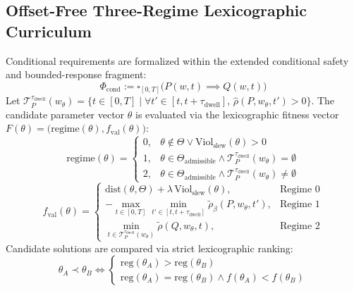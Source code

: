 \documentclass[journal]{IEEEtran}
\begin{document}
\subsection{Offset-Free Three-Regime Lexicographic Curriculum}
Conditional requirements are formalized within the extended conditional safety and bounded-response fragment:
\begin{equation}
\Phi_{\text{cond}} := \square_{[0, T]} \big(P(w, t) \implies Q(w, t)\big)
\end{equation}
Let $\mathcal{T}_P^{\tau_{\text{dwell}}}(w_\theta) = \{ t \in [0, T] \mid \forall t' \in [t, t+\tau_{\text{dwell}}], \, \hat{\rho}(P, w_\theta, t') > 0 \}$. The candidate parameter vector $\theta$ is evaluated via the lexicographic fitness vector $F(\theta) = \big(\text{regime}(\theta), f_{\text{val}}(\theta)\big)$:
\begin{equation}
\label{eq:regimes}
\text{regime}(\theta) = \begin{cases}
0, & \theta \notin \Theta \lor \text{Viol}_{\text{slew}}(\theta) > 0 \\
1, & \theta \in \Theta_{\text{admissible}} \land \mathcal{T}_P^{\tau_{\text{dwell}}}(w_\theta) = \emptyset \\
2, & \theta \in \Theta_{\text{admissible}} \land \mathcal{T}_P^{\tau_{\text{dwell}}}(w_\theta) \neq \emptyset
\end{cases}
\end{equation}
\begin{equation}
\label{eq:fval}
f_{\text{val}}(\theta) = \begin{cases}
\mathrm{dist}(\theta, \Theta) + \lambda \, \mathrm{Viol}_{\text{slew}}(\theta), & \text{Regime 0} \\
-\max\limits_{t \in [0, T]} \min\limits_{t' \in [t, t+\tau_{\text{dwell}}]} \tilde{\rho}_\beta(P, w_\theta, t'), & \text{Regime 1} \\
\min\limits_{t \in \mathcal{T}_P^{\tau_{\text{dwell}}}(w_\theta)} \tilde{\rho}(Q, w_\theta, t), & \text{Regime 2}
\end{cases}
\end{equation}
Candidate solutions are compared via strict lexicographic ranking:
\begin{equation}
\label{eq:lexorder}
\theta_A \prec \theta_B \iff \begin{cases}
\mathrm{reg}(\theta_A) > \mathrm{reg}(\theta_B) \\
\mathrm{reg}(\theta_A) = \mathrm{reg}(\theta_B) \land f(\theta_A) < f(\theta_B)
\end{cases}
\end{equation}
\end{document}

